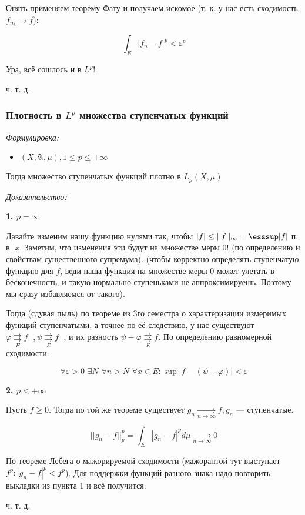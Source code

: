 \documentclass{article}
\def\dbl{\,\,}
\def\rsh#1{\underset{#1}{\rightrightarrows}}
\def\rshe{\rsh{E}}
\def\goesto#1{\underset{#1}{\longrightarrow}}
\def\toinf#1{\goesto{#1 \rightarrow \infty}}
\def\ntoinf{\toinf{n}}
\begin{document}
Опять применяем теорему Фату и получаем искомое (т. к. у нас есть сходимость $f_{n_k} \rightarrow f$):

\[\int_{E} |f_n - f|^p < \varepsilon^p\]

Ура, всё сошлось и в $L^p$!

ч. т. д. 

\subsubsection{Плотность в $L^p$ множества ступенчатых функций}
\textit{Формулировка:}

\begin{itemize}
    \item $(X, \mathfrak{A}, \mu), 1 \le p \le +\infty$
\end{itemize}

Тогда множество ступенчатых функций плотно в $L_p(X, \mu)$

\textit{Доказательство:}

\textbf{1. $p = \infty$}

Давайте изменим нашу функцию нулями так, чтобы $|f| \le ||f||_{\infty} = \esssup |f|$ п. в. $x$. Заметим, что изменения эти будут на множестве меры 0! (по определению и свойствам существенного супремума). (чтобы корректно определять ступенчатую функцию для $f$, веди наша функция на множестве меры 0 может улетать в бесконечность, и такую нормально ступеньками не аппроксимируешь. Поэтому мы сразу избавляемся от такого).

Тогда (сдувая пыль) по теореме из 3го семестра о характеризации измеримых функций ступенчатыми, а точнее по её следствию, у нас существуют $\varphi \rshe f_-, \psi \rshe f_+$, и их разность $\psi - \varphi \rshe f$. По определению равномерной сходимости:

\[\forall \varepsilon > 0 \dbl \exists N \dbl \forall n > N \dbl \forall x \in E: \sup |f - (\psi - \varphi)| < \varepsilon\]

\textbf{2. $p < +\infty$}

Пусть $f \ge 0$. Тогда по той же теореме существует $g_n \ntoinf f, g_n$ --- ступенчатые.

\[||g_n - f||_p^p = \int_{E} |g_n - f| ^p d\mu \ntoinf 0\]

По теореме Лебега о мажорируемой сходимости (мажорантой тут выступает $f^p: |g_n - f|^p < f^p$). Для поддержки функций разного знака надо повторить выкладки из пункта 1 и всё получится.

ч. т. д. 
\end{document}
